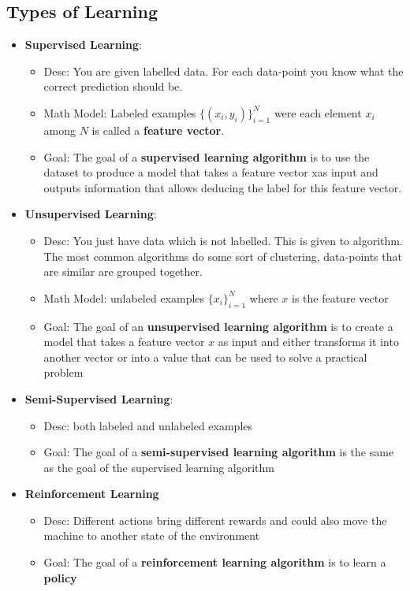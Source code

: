\subsection{Types of Learning}
\begin{itemize}
    \item \textbf{Supervised Learning}:
    \begin{itemize}
        \item Desc: You are given labelled data. For each data-point you know what the correct prediction should be.
        \item Math Model: Labeled examples $\{(x_i,y_i)\}^N_{i=1}$ were each element $x_i$ among $N$ is called a \textbf{feature vector}. \newline
        \item Goal: The goal of a \textbf{supervised learning algorithm} is to use the dataset to produce a model
        that takes a feature vector xas input and outputs information that allows deducing the label
        for this feature vector.
    \end{itemize}
    \item \textbf{Unsupervised Learning}:
    \begin{itemize}
        \item Desc: You just have data which is not labelled. This is given to
        algorithm. The most common algorithms do some sort of
        clustering, data-points that are similar are grouped together.
        \item Math Model: unlabeled examples $\{x_i\}^N_{i=1}$ where $x$ is the feature vector
        \item Goal: The goal of an \textbf{unsupervised learning algorithm} is
        to create a model that takes a feature vector $x$ as input and either transforms it into
        another vector or into a value that can be used to solve a practical problem
    \end{itemize}
    \item \textbf{Semi-Supervised Learning}:
    \begin{itemize}
        \item Desc: both labeled and unlabeled examples
        \item Goal: The goal of a \textbf{semi-supervised learning algorithm} is the same as the goal of
        the supervised learning algorithm
    \end{itemize}
    \item \textbf{Reinforcement Learning}
    \begin{itemize}
        \item Desc: Different actions bring different rewards and could also move the machine to another state of the environment
        \item Goal: The goal of a \textbf{reinforcement learning algorithm} is to learn a \textbf{policy}
    \end{itemize}
\end{itemize}


